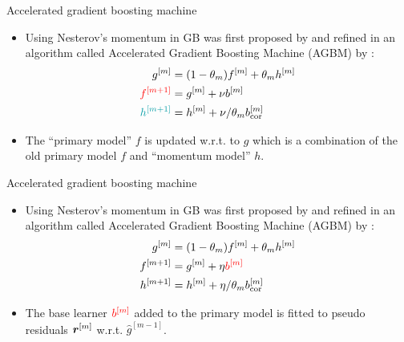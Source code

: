 \documentclass[t,10pt]{beamer}
\begin{document}
\begin{frame}{Accelerated gradient boosting machine}
  \begin{itemize}
    \item
      Using Nesterov's momentum in GB was first proposed by \cite{biau2019accelerated} and refined in an algorithm called Accelerated Gradient Boosting Machine (AGBM) by \cite{lu2020accelerating}:
      \begin{align*}
      g^{[m]} &= (1 - \theta_m) f^{[m]} + \theta_m h^{[m]}\\
      {\color{red}f^{[m+1]}} &=g^{[m]} + \nu b^{[m]} \\
      {\color{blue}h^{[m+1]}} &= h^{[m]} + \nu / \theta_m b^{[m]}_{\text{cor}}
      \end{align*}
    \item
      The {\color{red}\enquote{primary model} $f$} is updated w.r.t. to $g$ which is a combination of the old {\color{red}primary model $f$} and {\color{blue}\enquote{momentum model} $h$}.
  \end{itemize}
  \addtocounter{framenumber}{-1}
\end{frame}

\begin{frame}{Accelerated gradient boosting machine}
  \begin{itemize}
    \item
      Using Nesterov's momentum in GB was first proposed by \cite{biau2019accelerated} and refined in an algorithm called Accelerated Gradient Boosting Machine (AGBM) by \cite{lu2020accelerating}:
      \begin{align*}
      g^{[m]} &= (1 - \theta_m) f^{[m]} + \theta_m h^{[m]}\\
      f^{[m+1]} &=g^{[m]} + \eta {\color{red}b^{[m]}} \\
      {\color{black}h^{[m+1]}} &{\color{black}\hspace{0.1cm}= h^{[m]} + \eta / \theta_m b^{[m]}_{\text{cor}}}
      \end{align*}
    \item
      The base learner $\textcolor{red}{b^{[m]}}$ added to the primary model is fitted to pseudo residuals $\bm{r}^{[m]}$ w.r.t. $\hat{g}^{[m-1]}$.
  \end{itemize}
  \addtocounter{framenumber}{-1}
\end{frame}
\end{document}
